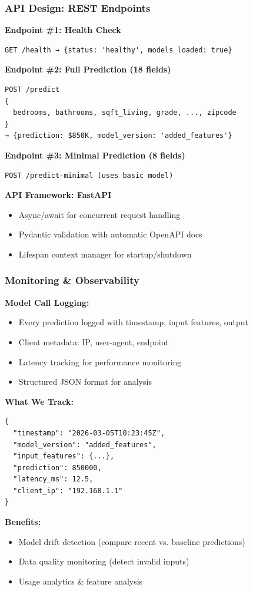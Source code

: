 \documentclass[aspectratio=169]{beamer}
\begin{document}
\begin{frame}[fragile]
\frametitle{API Design: REST Endpoints}

\textbf{Endpoint \#1: Health Check}
\begin{lstlisting}
GET /health → {status: 'healthy', models_loaded: true}
\end{lstlisting}

\textbf{Endpoint \#2: Full Prediction (18 fields)}
\begin{lstlisting}
POST /predict
{
  bedrooms, bathrooms, sqft_living, grade, ..., zipcode
}
→ {prediction: $850K, model_version: 'added_features'}
\end{lstlisting}

\textbf{Endpoint \#3: Minimal Prediction (8 fields)}
\begin{lstlisting}
POST /predict-minimal (uses basic model)
\end{lstlisting}

\textbf{API Framework: FastAPI}
\begin{itemize}
    \item Async/await for concurrent request handling
    \item Pydantic validation with automatic OpenAPI docs
    \item Lifespan context manager for startup/shutdown
\end{itemize}
\end{frame}

\begin{frame}[fragile]
\frametitle{Monitoring \& Observability}

\textbf{Model Call Logging:}
\begin{itemize}
    \item Every prediction logged with timestamp, input features, output
    \item Client metadata: IP, user-agent, endpoint
    \item Latency tracking for performance monitoring
    \item Structured JSON format for analysis
\end{itemize}

\vspace{0.3cm}
\textbf{What We Track:}
\begin{lstlisting}
{
  "timestamp": "2026-03-05T10:23:45Z",
  "model_version": "added_features",
  "input_features": {...},
  "prediction": 850000,
  "latency_ms": 12.5,
  "client_ip": "192.168.1.1"
}
\end{lstlisting}

\textbf{Benefits:}
\begin{itemize}
    \item Model drift detection (compare recent vs. baseline predictions)
    \item Data quality monitoring (detect invalid inputs)
    \item Usage analytics \& feature analysis
\end{itemize}
\end{frame}
\end{document}
